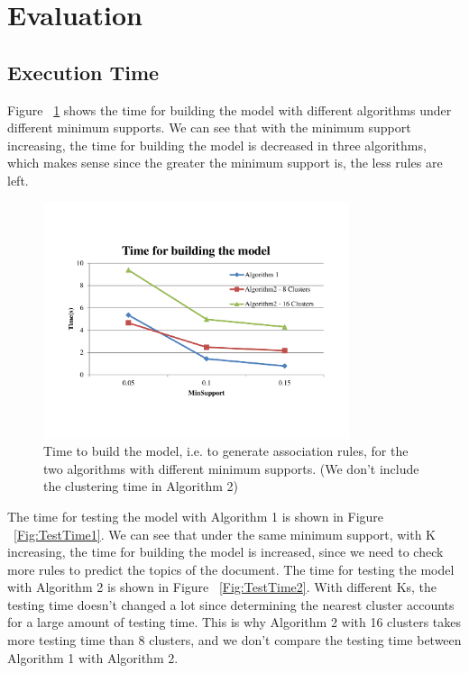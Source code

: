 \section{Evaluation}

\subsection{Execution Time}
Figure ~\ref{Fig:buildmodel} shows the time for building the model with different algorithms under different minimum supports. We can see that with the minimum support increasing, the time for building the model is decreased in three algorithms, which makes sense since the greater the minimum support is, the less rules are left.

\begin{figure}
\centering
\includegraphics[width=0.8\textwidth]{buildmodel}
\caption{\footnotesize Time to build the model, i.e. to generate association
rules, for the two algorithms with different minimum supports. (We don't include the clustering time in Algorithm 2)}
\label{Fig:buildmodel}
\end{figure}

The time for testing the model with Algorithm 1 is shown in Figure ~\ref{Fig:TestTime1}. We can see that under the same minimum support, with K increasing, the time for building the model is increased, since we need to check more rules to predict the topics of the document. The time for testing the model with Algorithm 2 is shown in Figure ~\ref{Fig:TestTime2}. With different Ks, the testing time doesn't changed a lot since determining the nearest cluster accounts for a large amount of testing time. This is why Algorithm 2 with 16 clusters takes more testing time than 8 clusters, and we don't compare the testing time between Algorithm 1 with Algorithm 2.

